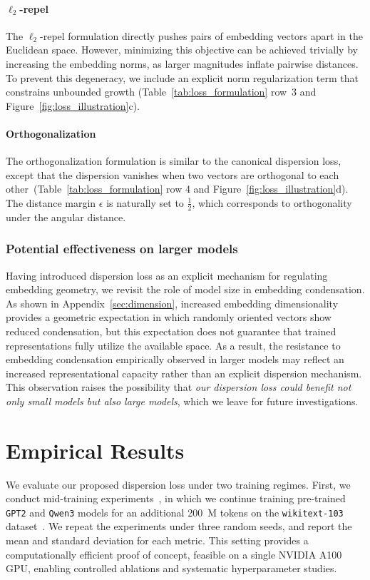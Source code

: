 \documentclass{article}
\theoremstyle{plain}
\theoremstyle{definition}
\theoremstyle{remark}
\begin{document}
\paragraph{$\ell_2$-repel}
The $\ell_2$-repel formulation directly pushes pairs of embedding vectors apart in the Euclidean space. However, minimizing this objective can be achieved trivially by increasing the embedding norms, as larger magnitudes inflate pairwise distances. To prevent this degeneracy, we include an explicit norm regularization term that constrains unbounded growth (Table~\ref{tab:loss_formulation} row~3 and Figure~\ref{fig:loss_illustration}c).

\paragraph{Orthogonalization}
The orthogonalization formulation is similar to the canonical dispersion loss, except that the dispersion vanishes when two vectors are orthogonal to each other~(Table~\ref{tab:loss_formulation} row 4 and Figure~\ref{fig:loss_illustration}d). The distance margin $\epsilon$ is naturally set to $\frac{1}{2}$, which corresponds to orthogonality under the angular distance.

\subsubsection{Potential effectiveness on larger models}

Having introduced dispersion loss as an explicit mechanism for regulating embedding geometry, we revisit the role of model size in embedding condensation. As shown in Appendix~\ref{sec:dimension}, increased embedding dimensionality provides a geometric expectation in which randomly oriented vectors show reduced condensation, but this expectation does not guarantee that trained representations fully utilize the available space. As a result, the resistance to embedding condensation empirically observed in larger models may reflect an increased representational capacity rather than an explicit dispersion mechanism. This observation raises the possibility that \textit{our dispersion loss could benefit not only small models but also large models}, which we leave for future investigations.


\vspace{-4pt}
\section{Empirical Results}
We evaluate our proposed dispersion loss under two training regimes. First, we conduct mid-training experiments~\cite{Octothinker}, in which we continue training pre-trained \texttt{GPT2} and \texttt{Qwen3} models for an additional 200~M tokens on the \texttt{wikitext-103} dataset~\cite{wikitext}. We repeat the experiments under three random seeds, and report the mean and standard deviation for each metric. This setting provides a computationally efficient proof of concept, feasible on a single NVIDIA A100 GPU, enabling controlled ablations and systematic hyperparameter studies.
\end{document}
